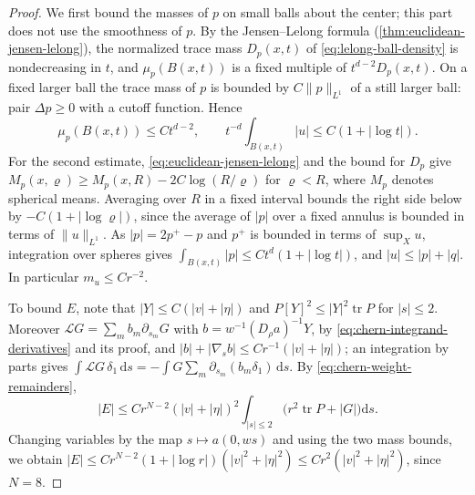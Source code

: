 \begin{proof}
We first bound the masses of $p$ on small balls about the center; this part does not use the smoothness of $p$. By the Jensen--Lelong formula (\cref{thm:euclidean-jensen-lelong}), the normalized trace mass $D_p(x,t)$ of \eqref{eq:lelong-ball-density} is nondecreasing in $t$, and $\mu_p(B(x,t))$ is a fixed multiple of $t^{d-2}D_p(x,t)$. On a fixed larger ball the trace mass of $p$ is bounded by $C\|p\|_{L^1}$ of a still larger ball: pair $\Delta p\geq0$ with a cutoff function. Hence
\[
 \mu_p(B(x,t))\leq Ct^{d-2},\qquad
   t^{-d}\int_{B(x,t)}|u|\leq C(1+|\log t|).
\]
For the second estimate, \eqref{eq:euclidean-jensen-lelong} and the bound for $D_p$ give $M_p(x,\varrho)\geq M_p(x,R)-2C\log(R/\varrho)$ for $\varrho<R$, where $M_p$ denotes spherical means. Averaging over $R$ in a fixed interval bounds the right side below by $-C(1+|\log\varrho|)$, since the average of $|p|$ over a fixed annulus is bounded in terms of $\|u\|_{L^1}$. As $|p|=2p^+-p$ and $p^+$ is bounded in terms of $\sup_Xu$, integration over spheres gives $\int_{B(x,t)}|p|\leq Ct^d(1+|\log t|)$, and $|u|\leq|p|+|q|$. In particular $m_u\leq Cr^{-2}$.

To bound $E$, note that $|Y|\leq C(|v|+|\eta|)$ and $P[Y]^2\leq|Y|^2\operatorname{tr}P$ for $|s|\leq2$. Moreover $\mathcal LG=\sum_mb_m\partial_{s_m}G$ with $b=w^{-1}(D_\rho a)^{-1}Y$, by \eqref{eq:chern-integrand-derivatives} and its proof, and $|b|+|\nabla_sb|\leq Cr^{-1}(|v|+|\eta|)$; an integration by parts gives $\int\mathcal LG\,\delta_1\,\mathrm ds=-\int G\sum_m\partial_{s_m}(b_m\delta_1)\,\mathrm ds$. By \eqref{eq:chern-weight-remainders},
\[
 |E|\leq Cr^{N-2}(|v|+|\eta|)^2\int_{|s|\leq2}\bigl(r^2\operatorname{tr}P+|G|\bigr)\mathrm ds.
\]
Changing variables by the map $s\mapsto a(0,ws)$ and using the two mass bounds, we obtain $|E|\leq Cr^{N-2}(1+|\log r|)(|v|^2+|\eta|^2)\leq Cr^2(|v|^2+|\eta|^2)$, since $N=8$.


\end{proof}
